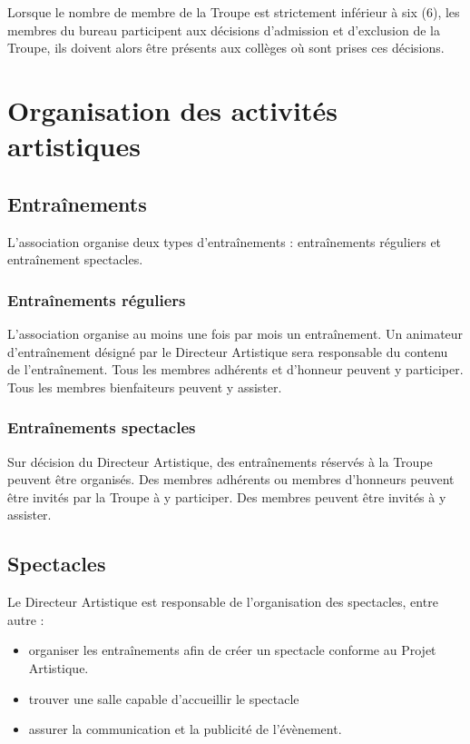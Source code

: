 \documentclass[a4paper,french,10pt]{article}
\begin{document}
Lorsque le nombre de membre de la Troupe est strictement inférieur à six (6), les membres du bureau participent aux décisions d'admission et d'exclusion de la Troupe, ils doivent alors être présents aux collèges où sont prises ces décisions.

\section{Organisation des activités artistiques}
\subsection{Entraînements}
L'association organise deux types d'entraînements : entraînements réguliers et entraînement spectacles.

\subsubsection{Entraînements réguliers}
L'association organise au moins une fois par mois un entraînement. Un animateur d'entraînement désigné par le Directeur Artistique sera responsable du contenu de l'entraînement. Tous les membres adhérents et d'honneur peuvent y participer. Tous les membres bienfaiteurs peuvent y assister.

\subsubsection{Entraînements spectacles}
Sur décision du Directeur Artistique, des entraînements réservés à la Troupe peuvent être organisés. Des membres adhérents ou membres d'honneurs peuvent être invités par la Troupe à y participer. Des membres peuvent être invités à y assister.

\subsection{Spectacles}
\label{sec:spectacles}
Le Directeur Artistique est responsable de l'organisation des spectacles, entre autre :
\begin{itemize}
\item organiser les entraînements afin de créer un spectacle conforme au Projet Artistique.
\item trouver une salle capable d'accueillir le spectacle
\item assurer la communication et la publicité de l'évènement.
\end{itemize}
\end{document}
